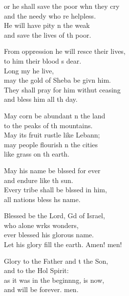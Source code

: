 \settowidth{\versewidth}{From oppression he will rescue their lives, *}
\begin{psalmverse}%
  \begin{patverse}
or he shall save the poor whn they cry\Med\\
and the needy who re helpless.\\
He will have pity n the weak\Med\\
and save the lives of th poor.

From oppression he will resce their lives,\Med\\
to him their blood \pointup{\i}s dear.\\
Long my he live,\Med\\
may the gold of Sheba be givn him.\\
They shall pray for him withut ceasing\Med\\
and bless him all th day.

May corn be abundant \pointup{\i}n the land\Med\\
to the peaks of th mountains.\\
May its fruit rustle like Lebann;\Flex\\
may people flourish \pointup{\i}n the cities\Med\\
like grass on th earth.

May his name be blssed for ever\Med\\
and endure like th sun.\\
Every tribe shall be blssed in him,\Med\\
all nations bless h\pointup{\i}s name.

Blessed be the Lord, Gd of Israel,\Med\\
who alone wrks wonders,\\
ever blessed his glor\pointup{\i}ous name.\Med\\
Let his glory fill the earth. Amen! men!

Glory to the Father and t the Son,\Med\\
and to the Hol Spirit:\\
as it was in the beginn\pointup{\i}ng, is now,\Med\\
and will be forever. men.
  \end{patverse}
\end{psalmverse}
